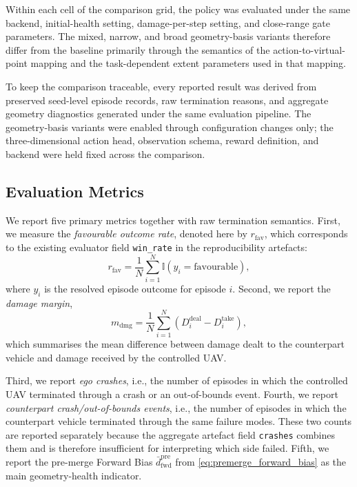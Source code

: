 \documentclass[drones,article,submit,pdftex,moreauthors]{Definitions/mdpi}
\begin{document}
Within each cell of the comparison grid, the policy was evaluated under the same backend, initial-health setting, damage-per-step setting, and close-range gate parameters. The mixed, narrow, and broad geometry-basis variants therefore differ from the baseline primarily through the semantics of the action-to-virtual-point mapping and the task-dependent extent parameters used in that mapping.

To keep the comparison traceable, every reported result was derived from preserved seed-level episode records, raw termination reasons, and aggregate geometry diagnostics generated under the same evaluation pipeline. The geometry-basis variants were enabled through configuration changes only; the three-dimensional action head, observation schema, reward definition, and backend were held fixed across the comparison.

\subsection{Evaluation Metrics}

We report five primary metrics together with raw termination semantics. First, we measure the \emph{favourable outcome rate}, denoted here by $r_{\mathrm{fav}}$, which corresponds to the existing evaluator field \texttt{win\_rate} in the reproducibility artefacts:
\begin{equation}
r_{\mathrm{fav}}
=
\frac{1}{N}
\sum_{i=1}^{N}
\mathbb{I}(y_i = \text{favourable}),
\end{equation}
where $y_i$ is the resolved episode outcome for episode $i$. Second, we report the \emph{damage margin},
\begin{equation}
m_{\mathrm{dmg}}
=
\frac{1}{N}
\sum_{i=1}^{N}
\left(
D^{\mathrm{deal}}_i - D^{\mathrm{take}}_i
\right),
\end{equation}
which summarises the mean difference between damage dealt to the counterpart vehicle and damage received by the controlled UAV.

Third, we report \emph{ego crashes}, i.e., the number of episodes in which the controlled UAV terminated through a crash or an out-of-bounds event. Fourth, we report \emph{counterpart crash/out-of-bounds events}, i.e., the number of episodes in which the counterpart vehicle terminated through the same failure modes. These two counts are reported separately because the aggregate artefact field \texttt{crashes} combines them and is therefore insufficient for interpreting which side failed. Fifth, we report the pre-merge Forward Bias $\bar{d}_{\mathrm{fwd}}^{\mathrm{pre}}$ from \eqref{eq:premerge_forward_bias} as the main geometry-health indicator.
\end{document}
